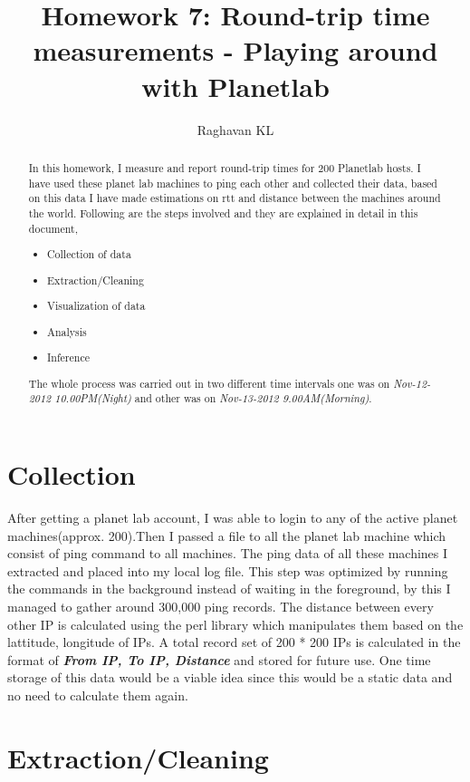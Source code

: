 \documentclass[twocolumn]{article}
\begin{document}
\title{Homework 7: Round-trip time measurements - Playing around with Planetlab}
\author{Raghavan KL}
\maketitle

\begin{abstract}
In this homework, I measure and report  round-trip times for 200 Planetlab hosts. I have used these planet lab machines to ping each other and collected their data, based on this data I have made estimations on rtt and distance between the machines around the world. Following are the steps involved and they are explained in detail in this document,

\begin{itemize}
\item Collection of data
\item Extraction/Cleaning
\item Visualization of data
\item Analysis
\item Inference
\end{itemize}

The whole process was carried out in two different time intervals one was on \textit{Nov-12-2012 10.00PM(Night)} and other was on \textit{Nov-13-2012 9.00AM(Morning)}.

\end{abstract}


\section{Collection}
After getting a planet lab account, I was able to login to any of the active planet machines(approx. 200).Then I passed a file to all the planet lab machine which consist of ping command to all machines. The ping data of all these machines I extracted and placed into my local log file. This step was optimized by running the commands in the background instead of waiting in the foreground, by this I managed to gather around 300,000 ping records. The distance between every other IP is calculated using the perl library which manipulates them based on the lattitude, longitude of IPs. A total record set of 200 * 200 IPs is calculated in the format of \textbf{\textit{From IP, To IP, Distance}} and stored for future use. One time storage of this data would be a viable idea since this would be a static data and no need to calculate them again.

\section{Extraction/Cleaning}
\end{document}
